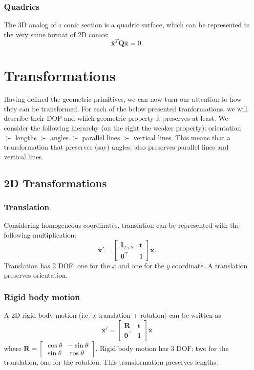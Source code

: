 \subsubsection{Quadrics}
The 3D analog of a conic section is a quadric surface, which can be represented in the very same format of 2D conics:
$$\bar{\mathbf{x}}^T \mathbf{Q} \bar{\mathbf{x}} = 0.$$

\section{Transformations}
Having defined the geometric primitives, we can now turn our attention to how they can be transformed.
For each of the below presented tranformations, we will describe their DOF and which geometric property it preserves at least.
We consider the following hierarchy (on the right the weaker property): orientation $\succ$ lengths $\succ$ angles $\succ$ parallel lines $\succ$ vertical lines.
This means that a transformation that preserves (say) angles, also preserves parallel lines and vertical lines.

\subsection{2D Transformations}

\subsubsection{Translation}
Considering homogeneous coordinates, translation can be represented with the following multiplication:
$$\bar{\mathbf{x}}'=\begin{bmatrix}
\mathbf{I}_{2\times 2} & \mathbf{t} \\
\mathbf{0}^{\top} & 1
\end{bmatrix} \bar{\mathbf{x}}.$$
Translation has 2 DOF: one for the $x$ and one for the $y$ coordinate. A translation preserves orientation.

\subsubsection{Rigid body motion}
A 2D rigid body motion (i.e. a translation + rotation) can be written as
$$\bar{\mathbf{x}}'=\begin{bmatrix}
\mathbf{R} & \mathbf{t} \\
\mathbf{0}^{\top} & 1
\end{bmatrix} \bar{\mathbf{x}}$$
where $\mathbf{R}=\begin{bmatrix}\cos \theta & -\sin \theta \\ \sin \theta & \cos \theta\end{bmatrix}$.
Rigid body motion has $3$ DOF: two for the translation, one for the rotation. This transformation preserves lengths.

